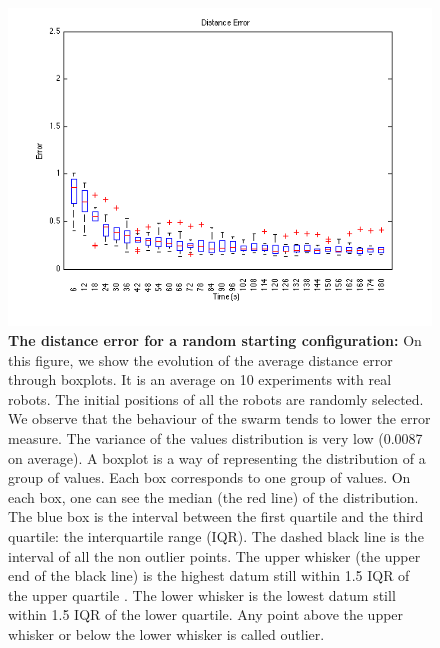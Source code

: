 \documentclass[oneside, a4paper, 12pt]{memoir}
\let\oldCaption\caption
\renewcommand{\caption}[2]{
\oldCaption[#1]{{\small\sffamily\bfseries #1:} #2}
}
\begin{document}
				\begin{figure}[!htp]
					\includegraphics[width=\textwidth]{../MATLAB/boxplot_random_distance.png}
					\caption{The distance error for a random starting configuration}{On this figure, we show the evolution of the average distance error through boxplots. It is an average on 10 experiments with real robots. The initial positions of all the robots are randomly selected. We observe that the behaviour of the swarm tends to lower the error measure. The variance of the values distribution is very low (0.0087 on average). A boxplot is a way of representing the distribution of a group of values. Each box corresponds to one group of values. On each box, one can see the median (the red line) of the distribution. The blue box is the interval between the first quartile and the third quartile: the interquartile range (IQR). The dashed black line is the interval of all the non outlier points. The upper whisker (the upper end of the black line) is the highest datum still within 1.5 IQR of the upper quartile \citep{wiki:003}. The lower whisker is the lowest datum still within 1.5 IQR of the lower quartile. Any point above the upper whisker or below the lower whisker is called outlier.}
					\label{fig:boxplot_random_distance}
				\end{figure}
			
\end{document}
